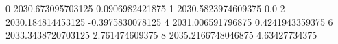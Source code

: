 0 2030.673095703125 0.0906982421875
1 2030.5823974609375 0.0
2 2030.184814453125 -0.3975830078125
4 2031.006591796875 0.4241943359375
6 2033.3438720703125 2.761474609375
8 2035.2166748046875 4.63427734375

